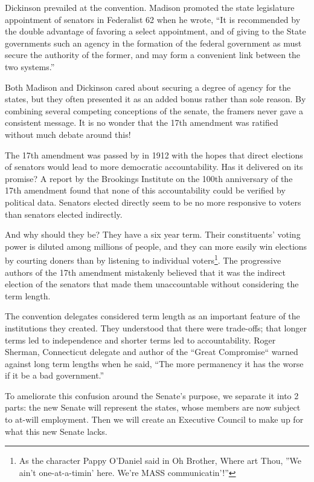 \documentclass{article}
\begin{document}
Dickinson prevailed at the convention. Madison promoted the state legislature appointment of senators in Federalist 62 when he wrote, “It is recommended by the double advantage of favoring a select appointment, and of giving to the State governments such an agency in the formation of the federal government as must secure the authority of the former, and may form a convenient link between the two systems.”\cite{Federalist62}

Both Madison and Dickinson cared about securing a degree of agency for the states, but they often presented it as an added bonus rather than sole reason. By combining several competing conceptions of the senate, the framers never gave a consistent message. It is no wonder that the 17th amendment was ratified without much debate around this!

The 17th amendment was passed by in 1912 with the hopes that direct elections of senators would lead to more democratic accountability\cite{Eisinger}. Has it delivered on its promise? A report by the Brookings Institute on the 100th anniversary of the 17th amendment found that none of this accountability could be verified by political data\cite{Schiller}. Senators elected directly seem to be no more responsive to voters than senators elected indirectly.

And why should they be? They have a six year term. Their constituents' voting power is diluted among millions of people, and they can more easily win elections by courting doners than by listening to individual voters\footnote{As the character Pappy O'Daniel said in Oh Brother, Where art Thou, ”We ain't one-at-a-timin' here. We're MASS communicatin'!”}. The progressive authors of the 17th amendment mistakenly believed that it was the indirect election of the senators that made them unaccountable without considering the term length.

The convention delegates considered term length as an important feature of the institutions they created. They understood that there were trade-offs; that longer terms led to independence and shorter terms led to accountability. Roger Sherman, Connecticut delegate and author of the “Great Compromise“ warned against long term lengths when he said, “The more permanency it has the worse if it be a bad government.”\cite{Madison}

To ameliorate this confusion around the Senate's purpose, we separate it into 2 parts: the new Senate will represent the states, whose members are now subject to at-will employment.  Then we will create an Executive Council to make up for what this new Senate lacks.
\end{document}
